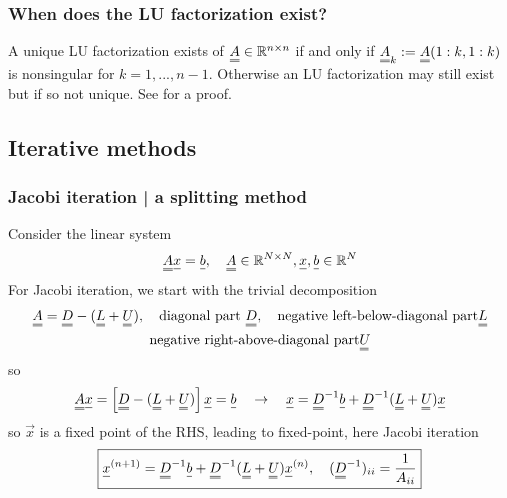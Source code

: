 

\subsubsection{When does the LU factorization exist? \skipthis}

A unique LU factorization exists of $\mat{A} \in \mathbb{R}^{n \times n}$ if and only if
$\mat{A}_k := \mat{A}(1:k,1:k)$ is nonsingular for $k=1,...,n-1$. Otherwise
an LU factorization may still exist but if so not unique. See \cite[Theorem 9.2]{higham02} for a proof.

\subsection{Iterative methods}

\subsubsection{Jacobi iteration | a splitting method}

Consider the linear system
\begin{equation}
    \mat{A} \vec{x} = \vec{b}, \quad \mat{A} \in \mathbb{R}^{N\times N}, \vec{x}, \vec{b} \in \mathbb{R}^N
\end{equation}
For Jacobi iteration, we start with the trivial decomposition
\begin{equation}
    \begin{gathered}
        \mat{A} = \mat{D} - (\mat{L} + \mat{U}), \quad \text{diagonal part } \mat{D}, \quad \text{negative left-below-diagonal part} \mat{L} \\
        \text{negative right-above-diagonal part} \mat{U}
    \end{gathered}
\end{equation}
so
\begin{equation}
    \mat{A}\vec{x} = \left[ \mat{D} - (\mat{L} + \mat{U}) \right] \vec{x} = \vec{b} \quad \rightarrow \quad \vec{x} = \mat{D}^{-1} \vec{b} + \mat{D}^{-1} (\mat{L} + \mat{U}) \vec{x}
\end{equation}
so $\vec{x}$ is a fixed point of the RHS, leading to fixed-point, here \textcolor{blue1}{Jacobi iteration}
\begin{equation}
    \boxed{\vec{x}^{(n+1)} = \mat{D}^{-1} \vec{b} + \mat{D}^{-1} (\mat{L} + \mat{U}) \vec{x}^{(n)}, \quad (\mat{D}^{-1})_{ii} = \frac{1}{A_{ii}}}
\end{equation}

